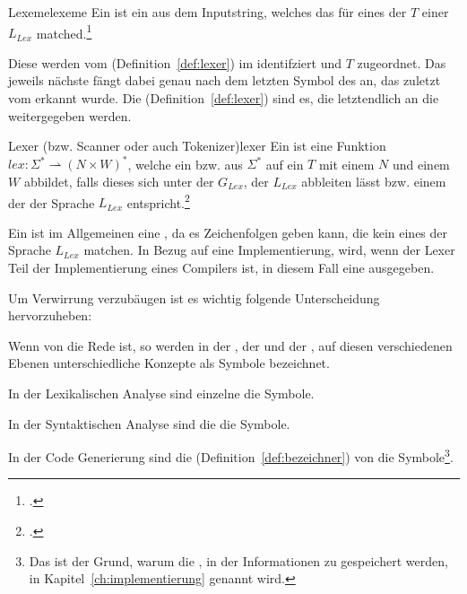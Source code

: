 \begin{Definition}{Lexeme}{lexeme}
  Ein  ist ein  aus dem Inputstring, welches das  für eines der  $T$ einer  ${L}_{Lex}$ matched.\footcite{thiemann_compilerbau_2021}
\end{Definition}

Diese  werden vom  (Definition~\ref{def:lexer}) im  identifziert und  $T$ zugeordnet. Das jeweils nächste  fängt dabei genau nach dem letzten Symbol des  an, das zuletzt vom  erkannt wurde. Die  (Definition~\ref{def:lexer}) sind es, die letztendlich an die  weitergegeben werden.

\begin{Definition}{Lexer (bzw. Scanner oder auch Tokenizer)}{lexer}
  Ein  ist eine  Funktion \hspace{0.2cm}$lex: \Sigma^{*} \rightharpoonup (N \times W)^{*}$, welche ein  bzw.  aus $\Sigma^{*}$ auf ein  $T$ mit einem  $N$ und einem  $W$ abbildet, falls dieses  sich unter der  ${G}_{Lex}$, der  ${L_{Lex}}$ abbleiten lässt bzw. einem der  der Sprache $L_{Lex}$ entspricht.\footcite{thiemann_compilerbau_2021}
\end{Definition}

Ein  ist im Allgemeinen eine , da es Zeichenfolgen geben kann, die kein  eines  der Sprache $L_{Lex}$ matchen. In Bezug auf eine Implementierung, wird, wenn der Lexer Teil der Implementierung eines Compilers ist, in diesem Fall eine  ausgegeben.

\begin{Special_Paragraph}
  Um Verwirrung verzubäugen ist es wichtig folgende Unterscheidung hervorzuheben:

  Wenn von  die Rede ist, so werden in der , der  und der , auf diesen verschiedenen Ebenen unterschiedliche Konzepte als Symbole bezeichnet.

  In der Lexikalischen Analyse sind einzelne  die Symbole.

  In der Syntaktischen Analyse sind die  die Symbole.

  In der Code Generierung sind die  (Definition~\ref{def:bezeichner}) von  die Symbole\footnote{Das ist der Grund, warum die , in der Informationen zu  gespeichert werden, in Kapitel~\ref{ch:implementierung}  genannt wird.}.
\end{Special_Paragraph}

